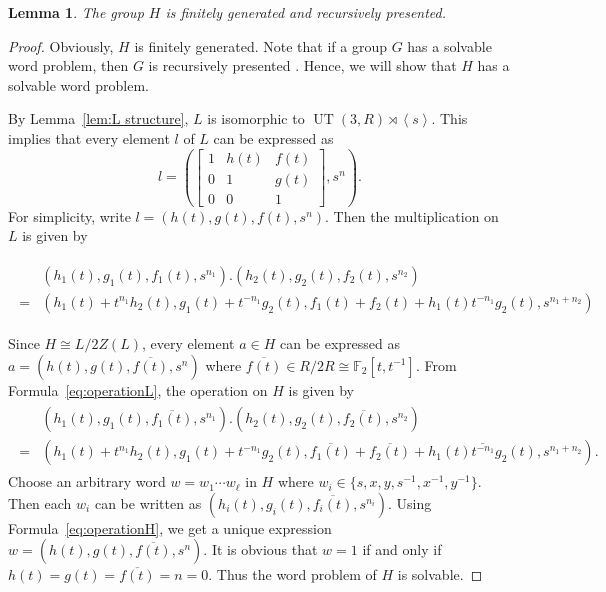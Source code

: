 \documentclass[11pt]{amsart}
\newtheorem{lem}[thm]{Lemma}
\theoremstyle{definition}
\DeclareMathOperator{\UT}{UT}
\begin{document}
\begin{lem} \label{lem:H-fgrp}
 The group $H$ is finitely generated and recursively presented.
\end{lem}
\begin{proof}
Obviously, $H$ is finitely generated.
Note that if a group $G$ has a solvable word problem, then $G$ is recursively presented \cite{rauzy2020computability}.
Hence, we will show that $H$ has a solvable word problem.

By Lemma~\ref{lem:L structure}, $L$ is isomorphic to $\UT(3,R) \rtimes \left< s \right>$.
This implies that every element $l$ of $L$ can be expressed as 
$$l=\left( \begin{bmatrix} 1 & h(t) & f(t) \\ 0 & 1 & g(t) \\ 0 & 0 & 1 
 \end{bmatrix},s^n \right ).$$
 For simplicity, write $l=(h(t),g(t),f(t),s^n)$.
 Then the multiplication on $L$ is given by

\begin{align} \label{eq:operationL}
 \begin{split}
&(h_1(t),g_1(t),f_1(t),s^{n_1}).(h_2(t),g_2(t),f_2(t),s^{n_2}) \\
=&(h_1(t)+t^{n_1}h_2(t),g_1(t)+t^{-n_1}g_2(t),f_1(t)+f_2(t)+h_1(t)t^{-n_1}g_2(t),s^{n_1+n_2})
  \end{split}
 \end{align}
 
 Since $H \cong L/2Z(L)$, every element $a \in H$ can be expressed as $a=(h(t),g(t),\overline{f(t)},s^n)$ where $\overline{f(t)} \in R/2R \cong \mathbb{F}_2[t,t^{-1}]$.
 From Formula~\eqref{eq:operationL}, the operation on $H$ is given by
 \begin{align} \label{eq:operationH}
 \begin{split}
  &(h_1(t),g_1(t),\overline{f_1(t)},s^{n_1}).(h_2(t),g_2(t),\overline{f_2(t)},s^{n_2}) \\ 
  =&(h_1(t)+t^{n_1}h_2(t),g_1(t)+t^{-n_1}g_2(t),\overline{f_1(t)}+\overline{f_2(t)}+\overline{h_1(t)t^{-n_1}g_2(t)},s^{n_1+n_2}).
 \end{split}
 \end{align}
 Choose an arbitrary word $w=w_1 \cdots w_\ell$ in $H$ where $w_i \in \{ s,x,y,s^{-1},x^{-1},y^{-1}\}$.
 Then each $w_i$ can be written as $(h_i(t),g_i(t),\overline{f_i(t)},s^{n_i})$.
 Using Formula~\eqref{eq:operationH}, we get a unique expression $w=(h(t),g(t),\overline{f(t)},s^{n})$.
 It is obvious that $w=1$ if and only if $h(t)=g(t)=\overline{f(t)}=n=0$.
 Thus the word problem of $H$ is solvable.
\end{proof}
\end{document}
